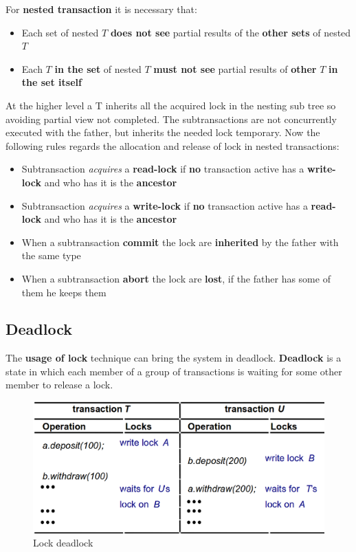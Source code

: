 For \textbf{nested transaction} it is necessary that:
\begin{itemize}
    \item Each set of nested \(T\) \textbf{does not see} partial results of the \textbf{other sets} of nested \(T\)
    \item Each \(T\) \textbf{in the set} of nested \(T\) \textbf{must not see} partial results of \textbf{other} \(T\) \textbf{in the set itself}
\end{itemize}
At the higher level a T inherits all the acquired lock in the nesting sub tree so avoiding partial view not completed. The subtransactions are not concurrently executed with the father, but inherits the needed lock temporary. Now the following rules regards the allocation and release of lock in nested transactions:
\begin{itemize}
    \item Subtransaction \textit{acquires} a \textbf{read-lock} if \textbf{no} transaction active has a \textbf{write-lock} and who has it is the \textbf{ancestor}
    \item Subtransaction \textit{acquires} a \textbf{write-lock} if \textbf{no} transaction active has a \textbf{read-lock} and who has it is the \textbf{ancestor}
    \item When a subtransaction \textbf{commit} the lock are \textbf{inherited} by the father with the same type
    \item When a subtransaction \textbf{abort} the lock are \textbf{lost}, if the father has some of them he keeps them
\end{itemize}
 \newpage
\subsection{Deadlock}
The \textbf{usage of lock} technique can bring the system in deadlock. \textbf{Deadlock} is a state in which each member of a group of transactions is waiting for some other member to release a lock.

\begin{figure}[!h]
    \centering
    \includegraphics[width=.60\linewidth]{images/TransactionAndConcurrencyControl/deadlockEx.png}
    \caption{Lock deadlock}
\end{figure}

